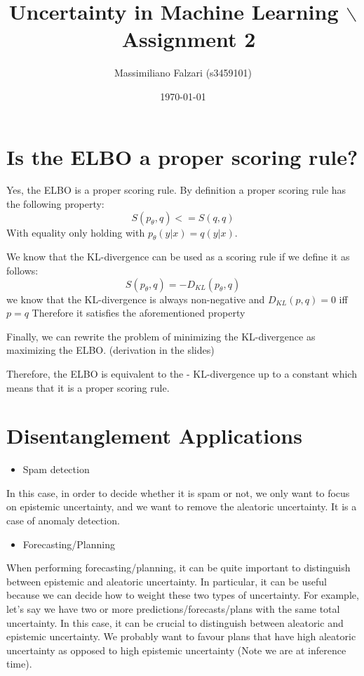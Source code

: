 \documentclass[11pt]{article}
\author{Massimiliano Falzari (s3459101)}
\date{\today}
\title{Uncertainty in Machine Learning $\backslash$\ Assignment 2}
\begin{document}
\maketitle
\tableofcontents

\section{Is the ELBO a proper scoring rule?}
\label{sec:org84d28b2}
Yes, the ELBO is a proper scoring rule.
By definition a proper scoring rule has the following property:
$$S(p_{\theta},q) <= S(q,q)$$
With equality only holding with \(p_{\theta}(y|x) = q(y|x)\).

We know that the KL-divergence can be used as a scoring rule if we
define it as follows:
$$S(p_{\theta},q) = -D_{KL}(p_{\theta},q)$$
we know that the KL-divergence is always non-negative and
\(D_{KL}(p,q)=0\) iff \(p=q\)
Therefore it satisfies the aforementioned property

Finally, we can rewrite the problem of minimizing the KL-divergence as
maximizing the ELBO. (derivation in the slides)

Therefore, the ELBO is equivalent to the - KL-divergence up to
a constant which means that it is a proper scoring rule.
\section{Disentanglement Applications}
\label{sec:orgbeb721f}
\begin{itemize}
\item Spam detection
\end{itemize}


In this case, in order to decide whether it is spam or not, we only
want to focus on epistemic uncertainty, and we want to remove the
aleatoric uncertainty. It is a case of anomaly detection.

\begin{itemize}
\item Forecasting/Planning
\end{itemize}


When performing forecasting/planning, it can be quite important to
distinguish between epistemic and aleatoric uncertainty. In
particular, it can be useful because we can decide how to weight
these two types of uncertainty. For example, let's say we have two or more
predictions/forecasts/plans with the same total
uncertainty. In this case, it can be crucial to distinguish between
aleatoric and epistemic uncertainty. We probably want to favour plans
that have high aleatoric uncertainty as opposed to high epistemic
uncertainty (Note we are at inference time).
\end{document}
